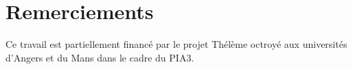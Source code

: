 \documentclass[french]{pfia}
\begin{document}
%
%
%
%
%
\section*{Remerciements}
Ce travail est partiellement financé par le projet Thélème octroyé aux universités d'Angers et du Mans dans le cadre du PIA3.
%
%




\end{document}
